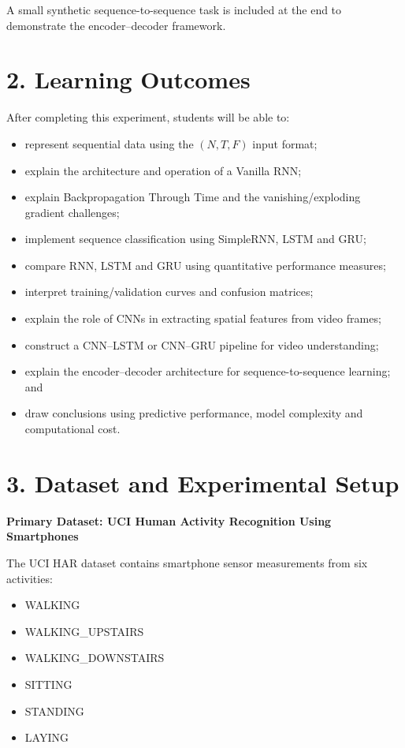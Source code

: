 \documentclass[10pt]{article}
\begin{document}
A small synthetic sequence-to-sequence task is included at the end to
demonstrate the encoder--decoder framework.

\section*{2. Learning Outcomes}

After completing this experiment, students will be able to:

\begin{itemize}
\item represent sequential data using the $(N,T,F)$ input format;
\item explain the architecture and operation of a Vanilla RNN;
\item explain Backpropagation Through Time and the vanishing/exploding gradient challenges;
\item implement sequence classification using SimpleRNN, LSTM and GRU;
\item compare RNN, LSTM and GRU using quantitative performance measures;
\item interpret training/validation curves and confusion matrices;
\item explain the role of CNNs in extracting spatial features from video frames;
\item construct a CNN--LSTM or CNN--GRU pipeline for video understanding;
\item explain the encoder--decoder architecture for sequence-to-sequence learning; and
\item draw conclusions using predictive performance, model complexity and computational cost.
\end{itemize}

\section*{3. Dataset and Experimental Setup}

\textbf{Primary Dataset: UCI Human Activity Recognition Using Smartphones}

The UCI HAR dataset contains smartphone sensor measurements from six activities:

\begin{itemize}
\item WALKING
\item WALKING\_UPSTAIRS
\item WALKING\_DOWNSTAIRS
\item SITTING
\item STANDING
\item LAYING
\end{itemize}
\end{document}
